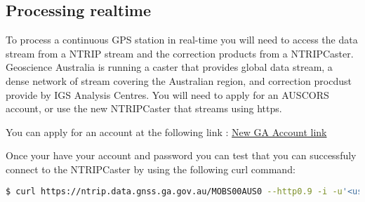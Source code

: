 \subsection{Processing realtime}
To process a continuous GPS station in real-time you will need to access the data stream from a NTRIP stream and the correction products from a NTRIPCaster.
Geoscience Australia is running a caster that provides global data stream, a dense network of stream covering the Australian region, and correction procdust provide by IGS Analysis Centres.
You will need to apply for an AUSCORS account, or use the new NTRIPCaster that streams using https.

You can apply for an account at the following link : \href{https://gnss-users-prod.auth.ap-southeast-2.amazoncognito.com/login?response_type=code&client_id=11njl767q0tl1faf9qna469vl1&redirect_uri=https://search-gnss-elasticsearch-prod-5omhch5quzlu5dcpbct4ev5qz4.ap-southeast-2.es.amazonaws.com/_plugin/kibana/app/kibana&state=e36b2054-7ace-4931-91a3-5ba6de893917}{New GA Account link}

Once your have your account and password you can test that you can successfuly connect to the NTRIPCaster by using the following curl command:
\begin{lstlisting}[language=bash]
$ curl https://ntrip.data.gnss.ga.gov.au/MOBS00AUS0 --http0.9 -i -u'<username>:<password> --output -'
\end{lstlisting}

